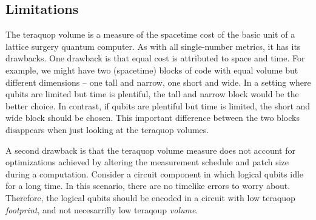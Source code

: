 \subsection{Limitations}\label{subsec:teraquop-limitations}

The teraquop volume is a measure of the spacetime cost of the basic unit of a lattice surgery quantum computer. As with all single-number metrics, it has its drawbacks.
One drawback is that equal cost is attributed to space and time.
For example, we might have two (spacetime) blocks of code with equal volume but different dimensions -- one tall and narrow, one short and wide.
In a setting where qubits are limited but time is plentiful, the tall and narrow block would be the better choice.
In contrast, if qubits are plentiful but time is limited, the short and wide block should be chosen.
This important difference between the two blocks disappears when just looking at the teraquop volumes.

A second drawback is that the teraquop volume measure does not account for optimizations achieved by altering the measurement schedule and patch size during a computation.
Consider a circuit component in which logical qubits idle for a long time. In this scenario, there are no timelike errors to worry about.
Therefore, the logical qubits should be encoded in a circuit with low teraquop \emph{footprint}, and not necesarrilly low teraqoup \emph{volume}.
